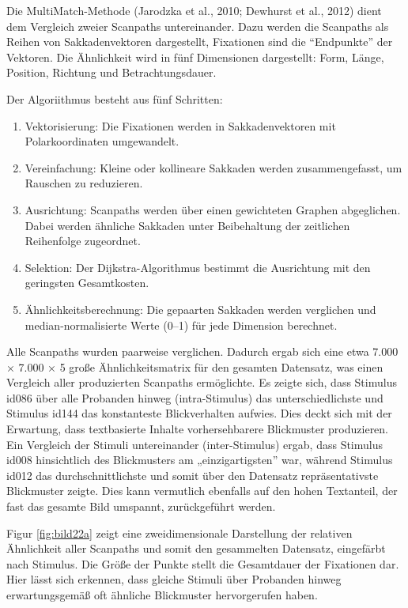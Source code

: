 \documentclass[
    language=german, %
    thesis=seminar, %
    supervisor=postdoc, %
    multiauthor=true, %
    ]{settings/csssa-thesis}
\begin{document}
Die MultiMatch-Methode (Jarodzka et al., 2010; Dewhurst et al., 2012) dient dem Vergleich zweier Scanpaths untereinander. Dazu werden die Scanpaths als Reihen von Sakkadenvektoren dargestellt, Fixationen sind die “Endpunkte” der Vektoren. Die Ähnlichkeit wird in fünf Dimensionen dargestellt: Form, Länge, Position, Richtung und Betrachtungsdauer. 



Der Algoriithmus besteht aus fünf Schritten: 
\begin{enumerate}
	\item  Vektorisierung: Die Fixationen werden in Sakkadenvektoren mit Polarkoordinaten umgewandelt. 
	\item  Vereinfachung: Kleine oder kollineare Sakkaden werden zusammengefasst, um Rauschen zu reduzieren. 
	\item  Ausrichtung: Scanpaths werden über einen gewichteten Graphen abgeglichen. Dabei werden ähnliche Sakkaden unter Beibehaltung der zeitlichen Reihenfolge zugeordnet.
	\item Selektion: Der Dijkstra-Algorithmus bestimmt die Ausrichtung mit den geringsten Gesamtkosten. 
	\item Ähnlichkeitsberechnung: Die gepaarten Sakkaden werden verglichen und median-normalisierte Werte (0–1) für jede Dimension berechnet.

\end{enumerate}


Alle Scanpaths wurden paarweise verglichen. Dadurch ergab sich eine etwa 7.000 × 7.000 × 5 gro{\ss}e Ähnlichkeitsmatrix für den gesamten Datensatz, was einen Vergleich aller produzierten Scanpaths ermöglichte. Es zeigte sich, dass Stimulus id086 über alle Probanden hinweg (intra-Stimulus) das unterschiedlichste und Stimulus id144 das konstanteste Blickverhalten aufwies. Dies deckt sich mit der Erwartung, dass textbasierte Inhalte vorhersehbarere Blickmuster produzieren. Ein Vergleich der Stimuli untereinander (inter-Stimulus) ergab, dass Stimulus id008 hinsichtlich des Blickmusters am „einzigartigsten” war, während Stimulus id012 das durchschnittlichste und somit über den Datensatz repräsentativste Blickmuster zeigte. Dies kann vermutlich ebenfalls auf den hohen Textanteil, der fast das gesamte Bild umspannt, zurückgeführt werden. 

Figur \ref{fig:bild22a} zeigt eine zweidimensionale Darstellung der relativen Ähnlichkeit aller Scanpaths und somit den gesammelten Datensatz, eingefärbt nach Stimulus. Die Grö{\ss}e der Punkte stellt die Gesamtdauer der Fixationen dar. Hier lässt sich erkennen, dass gleiche Stimuli über Probanden hinweg erwartungsgemä{\ss} oft ähnliche Blickmuster hervorgerufen haben.  
\end{document}
